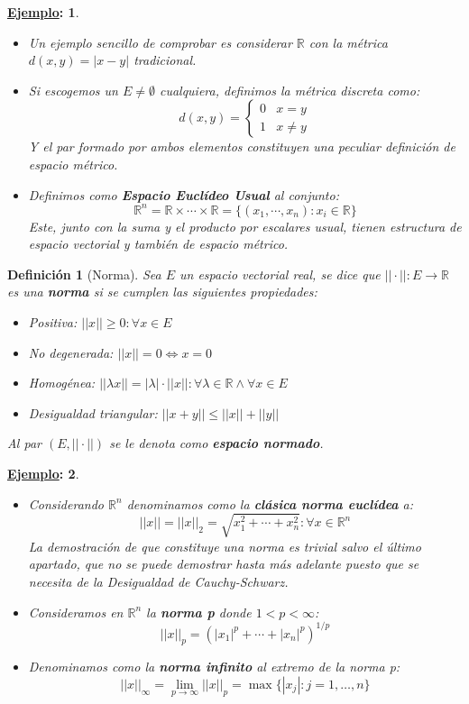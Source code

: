 \documentclass[10pt,a4paper,openright]{book}
\theoremstyle{break}
\newtheorem*{defi}{Definición}
\newtheorem*{ej}{\underline{Ejemplo}:}
\begin{document}
\begin{ej}
\begin{itemize}
\item Un ejemplo sencillo de comprobar es considerar $\mathbb R$ con la métrica $d(x,y) = |x-y|$ tradicional.

\item Si escogemos un $E\neq \emptyset$ cualquiera, definimos la métrica discreta como:
$$d(x,y) = \begin{cases} 0 & x= y \\ 1 & x\neq y \end{cases}$$
Y el par formado por ambos elementos constituyen una peculiar definición de espacio métrico.	

\item Definimos como \textbf{Espacio Euclídeo Usual} al conjunto:
$$\mathbb R ^n = \mathbb R\times \cdots \times \mathbb R = \{(x_1, \cdots, x_n): x_i\in \mathbb R\}$$
Este, junto con la suma y el producto por escalares usual, tienen estructura de espacio vectorial y también de espacio métrico.
\end{itemize}
\end{ej}

\begin{defi}[Norma]
Sea $E$ un espacio vectorial real, se dice que $||\cdot||: E \rightarrow \mathbb R$ es una \textbf{norma} si se cumplen las siguientes propiedades:
\begin{itemize}
\item Positiva: $||x||\geq 0: \forall x \in E$
\item No degenerada: $||x|| = 0 \Leftrightarrow x = 0$
\item Homogénea: $||\lambda x|| = |\lambda| \cdot ||x||: \forall \lambda \in \mathbb R \wedge \forall x \in E$
\item Desigualdad triangular: $||x+y||\leq ||x|| + ||y||$
\end{itemize}
Al par $(E,||\cdot||)$ se le denota como \textbf{espacio normado}.
\end{defi}

\begin{ej}
\begin{itemize}
\item Considerando $\mathbb R^n$ denominamos como la \textbf{clásica norma euclídea} a:
$$||x|| = ||x||_2 = \sqrt{x_1^2+\cdots + x_n^2} : \forall x \in \mathbb R^n $$
La demostración de que constituye una norma es trivial salvo el último apartado, que no se puede demostrar hasta más adelante puesto que se necesita de la \textit{Desigualdad de Cauchy-Schwarz}.
\item Consideramos en $\mathbb R^n$ la \textbf{norma p} donde $1<p<\infty$:
$$||x||_p = \left(|x_1|^p + \cdots + |x_n|^p\right)^{1/p}$$
\item Denominamos como la \textbf{norma infinito} al extremo de la norma p:
$$||x||_\infty = \lim_{p\rightarrow\infty} ||x||_p = \max \{|x_j| : j = 1,\ldots, n\}$$
\end{itemize}
\end{ej}
\end{document}
